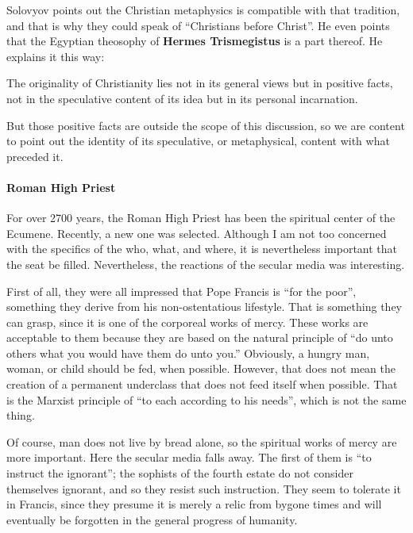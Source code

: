 Solovyov points out the Christian metaphysics is compatible with that tradition, and that is why they could speak of ``Christians before Christ''. He even points that the Egyptian theosophy of \textbf{Hermes Trismegistus} is a part thereof. He explains it this way:

\begin{quotex}
The originality of Christianity lies not in its general views but in positive facts, not in the speculative content of its idea but in its personal incarnation.
\end{quotex}


But those positive facts are outside the scope of this discussion, so we are content to point out the identity of its speculative, or metaphysical, content with what preceded it.

\paragraph{Roman High Priest}


For over 2700 years, the Roman High Priest has been the spiritual center of the Ecumene. Recently, a new one was selected. Although I am not too concerned with the specifics of the who, what, and where, it is nevertheless important that the seat be filled. Nevertheless, the reactions of the secular media was interesting.

First of all, they were all impressed that Pope Francis is ``for the poor'', something they derive from his non-ostentatious lifestyle. That is something they can grasp, since it is one of the corporeal works of mercy. These works are acceptable to them because they are based on the natural principle of ``do unto others what you would have them do unto you.'' Obviously, a hungry man, woman, or child should be fed, when possible. However, that does not mean the creation of a permanent underclass that does not feed itself when possible. That is the Marxist principle of ``to each according to his needs'', which is not the same thing.

Of course, man does not live by bread alone, so the spiritual works of mercy are more important. Here the secular media falls away. The first of them is ``to instruct the ignorant''; the sophists of the fourth estate do not consider themselves ignorant, and so they resist such instruction. They seem to tolerate it in Francis, since they presume it is merely a relic from bygone times and will eventually be forgotten in the general progress of humanity.

